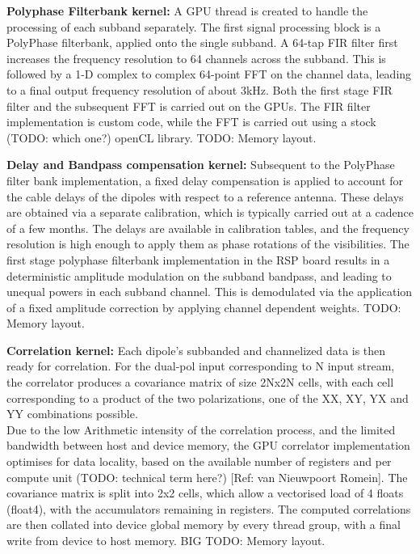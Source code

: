 \documentclass{aa}
\begin{document}
\textbf {Polyphase Filterbank kernel:}
A GPU thread is created to handle the processing of each subband separately. The
first signal processing block is a PolyPhase filterbank, applied onto the single
subband. A  64-tap FIR  filter first  increases the  frequency resolution  to 64
channels  across the  subband.  This  is followed  by a  1-D complex  to complex
64-point FFT on the channel data, leading to a final output frequency resolution
of about 3kHz. Both the first stage FIR filter and the subsequent FFT is carried
out on the GPUs. The FIR filter  implementation is custom code, while the FFT is
carried out using a stock (TODO: which one?) openCL library. TODO: Memory layout.

\textbf {Delay and Bandpass compensation kernel:} 
Subsequent  to  the   PolyPhase  filter  bank  implementation,   a  fixed  delay
compensation is  applied to  account for  the cable delays  of the  dipoles with
respect  to a  reference  antenna.  These  delays are  obtained  via a  separate
calibration, which is  typically carried out at  a cadence of a  few months. The
delays are available in calibration tables, and the frequency resolution is high
enough to  apply them as  phase rotations of  the visibilities. The  first stage
polyphase filterbank implementation in the  RSP board results in a deterministic
amplitude modulation on  the subband bandpass, and leading to  unequal powers in
each  subband channel.  This  is  demodulated via  the  application  of a  fixed
amplitude correction by applying channel dependent weights. TODO: Memory layout.

\textbf {Correlation kernel:}
Each dipole's subbanded and channelized data  is then ready for correlation. For
the dual-pol  input corresponding to N  input stream, the correlator  produces a
covariance matrix of size 2Nx2N cells, with each cell corresponding to a product
of the two polarizations, one of the XX, XY, YX and YY combinations possible.\\

Due to the low Arithmetic intensity  of the correlation process, and the limited
bandwidth  between host  and device  memory, the  GPU correlator  implementation
optimises for data locality, based on  the available number of registers and per
compute  unit (TODO:  technical term  here?) [Ref:  van Nieuwpoort  Romein]. The
covariance matrix is  split into 2x2 cells,  which allow a vectorised  load of 4
floats  (float4), with  the accumulators  remaining in  registers. The  computed
correlations are then collated into device  global memory by every thread group,
with a final write from device to host memory. BIG TODO: Memory layout.
\end{document}
